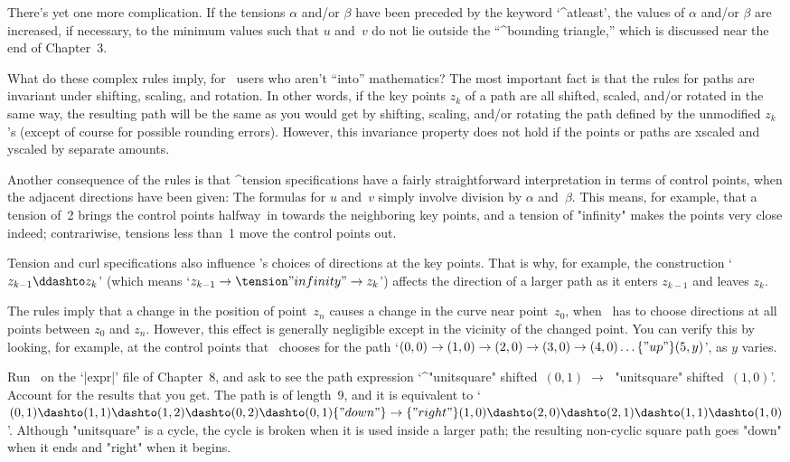 {{{{\ddanger There's yet one more complication. If the tensions $\alpha$ and/or
$\beta$ have been preceded by the keyword `^{atleast}', the values of
$\alpha$ and/or $\beta$ are increased, if necessary, to the minimum
values such that $u$ and~$v$ do not lie outside the ``^{bounding triangle},''
which is discussed near the end of Chapter~3.

\danger What do these complex rules imply, for \MF\ users who aren't ``into''
mathematics? The most important fact is that the rules for paths are
invariant under shifting, scaling, and rotation. In other words, if the
key points $z_k$ of a path are all shifted, scaled, and/or rotated in the
same way, the resulting path will be the same as you would get by
shifting, scaling, and/or rotating the path defined by the unmodified
$z_k$'s (except of course for possible rounding errors). However,
this invariance property does not hold if the points or paths are
xscaled and yscaled by separate amounts.

\danger Another consequence of the rules is that ^{tension} specifications
have a fairly straightforward interpretation in terms of control points,
when the adjacent directions have been given: The formulas for $u$ and~$v$
simply involve division by $\alpha$ and~$\beta$. This means, for example,
that a tension of~2 brings the control points halfway~in towards the
neighboring key points, and a tension of "infinity" makes the points very
close indeed; contrariwise, tensions less than~1 move the control
points out.

\danger Tension and curl specifications also influence \MF's choices of
directions at the key points. That is why, for example, the construction
`$z_{k-1}\ddashto z_k$' (which means `$z_{k-1}\to\tension"infinity"\to
z_k$'\thinspace) affects the direction of a larger path as it enters
$z_{k-1}$ and leaves $z_k$.

\danger The rules imply that a change in the position of point~$z_n$
causes a change in the curve near point~$z_0$, when \MF\ has to choose
directions at all points between $z_0$ and $z_n$. However, this effect
is generally negligible except in the vicinity of the changed point.
You can verify this by looking, for example, at the control
points that \MF\ chooses for the path `$(0,0)\to(1,0)\to(2,0)\to
(3,0)\to(4,0)\ldots\{"up"\}(5,y)$', as $y$ varies.

\ddangerexercise Run \MF\ on the `|expr|' file of Chapter~8, and ask
to see the path expression `^"unitsquare" shifted~$(0,1)\;\to\;$
"unitsquare" shifted~$(1,0)$'. Account for the results that you get.
\answer The path is of length~9, and it is equivalent to
`$(0,1)\dashto(1,1)\dashto(1,2)\dashto(0,2)\dashto(0,1)\{"down"\}
\to\{"right"\}(1,0)\dashto(2,0)\dashto(2,1)\dashto(1,1)\dashto(1,0)$'.
Although "unitsquare" is a cycle, the cycle is broken when it is used
inside a larger path; the resulting non-cyclic square path goes "down"
when it ends and "right" when it begins.

}}}}
